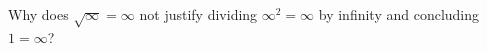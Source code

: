 Why does $\sqrt{\infty}=\infty$ not justify dividing $\infty^2=\infty$ by infinity and concluding $1=\infty$?
